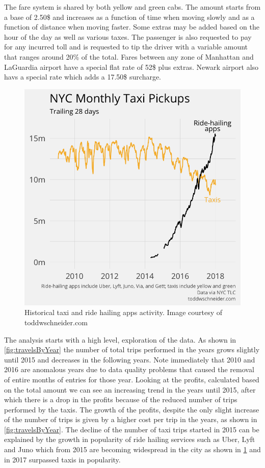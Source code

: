 \documentclass{acm_proc_article-sp-sigmod09}
\begin{document}
The fare system is shared by both yellow and green cabs. The amount starts from a base of 2.50\$ and increases as a function of time when moving slowly and as a function of distance when moving faster. Some extras may be added based on the hour of the day as well as various taxes. The passenger is also requested to pay for any incurred toll and is requested to tip the driver with a variable amount that ranges around 20\% of the total. Fares between any zone of Manhattan and LaGuardia airport have a special flat rate of 52\$ plus extras. Newark airport also havs a special rate which adds a 17.50\$ surcharge.

\begin{figure}
	\centering
	\includegraphics[width=1\columnwidth]{resources/uber_vs_taxis.png}
	\caption{Historical taxi and ride hailing apps activity. Image courtesy of toddwschneider.com}
	\label{fig:uberVsTaxis}
\end{figure}

The analysis starts with a high level, exploration of the data. As shown in \cref{fig:travelsByYear} the number of total trips performed in the years grows slightly until 2015 and decreases in the following years. Note immediately that 2010 and 2016 are anomalous years due to data quality problems that caused the removal of entire months of entries for those year. Looking at the profits, calculated based on the total amount we can see an increasing trend in the years until 2015, after which there is a drop in the profits because of the reduced number of trips performed by the taxis. The growth of the profits, despite the only slight increase of the number of trips is given by a higher cost per trip in the years, as shown in \cref{fig:travelsByYear}. The decline of the number of taxi trips started in 2015 can be explained by the growth in popularity of ride hailing services such as Uber, Lyft and Juno which from 2015 are becoming widespread in the city as shown in \cref{fig:uberVsTaxis} and in 2017 surpassed taxis in popularity.
\end{document}
